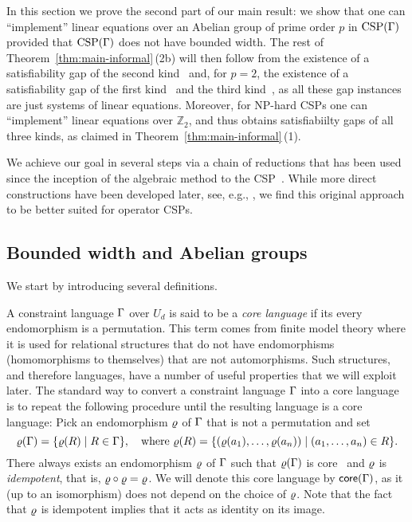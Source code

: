 In this section we prove the second part of our main result: we show that one
can ``implement'' linear equations over an Abelian group of prime order $p$
in ${\rm CSP}(\Gamma)$ provided that ${\rm CSP}(\Gamma)$ does not have bounded width. The rest
of Theorem~\ref{thm:main-informal}\,(2b) will then follow from the existence of a
satisfiability gap of the second kind~\cite{SZ24:personal} and, for $p=2$, the
existence of a satisfiability gap of the first
kind~\cite{Mermin1990simple,Mermin1993hidden,Peres1990incompatible} and the
third kind~\cite{Slofstra20:jams}, as all these gap instances are just systems
of linear equations. Moreover, for NP-hard CSPs one can ``implement'' linear
equations over $\mathbb{Z}_2$, and thus obtains satisfiabiilty gaps of all three
kinds, as claimed in Theorem~\ref{thm:main-informal}\,(1).

We achieve our goal in several steps via a chain of reductions that has been
used since the inception of the algebraic method to the
CSP~\cite{Bulatov05:classifying}. While more direct constructions have been
developed later, see, e.g., \cite{BKW17}, we find this original approach to be
better suited for operator CSPs.


\subsection{Bounded width and Abelian groups}

We start by introducing several definitions. 

A constraint language $\Gamma$ over $U_d$ is said to be a \emph{core language} if
its every endomorphism is a permutation.
This term comes from finite model theory where it is used for relational structures that do not have endomorphisms (homomorphisms to themselves) that are not automorphisms. Such structures, and therefore languages, have a number of useful properties that we will exploit later. The standard way to convert a constraint language $\Gamma$ into a core language is to repeat the following procedure until the resulting language is a core language: Pick an endomorphism $\varrho$ of $\Gamma$ that is not a permutation and set 
\[
\varrho(\Gamma)=\{\varrho(R)\mid R\in\Gamma\}, \quad\text{where } \varrho(R)=\{(\varrho(a_1),\ldots, \varrho(a_n))\mid  (a _1,\ldots, a _{n})\in R\}.
\]
There always exists an endomorphism $\varrho$ of $\Gamma$ such that $\varrho(\Gamma)$ is
core~\cite{Bulatov05:classifying,BKW17} and $\varrho$ is \emph{idempotent}, that is, $\varrho\circ\varrho=\varrho$. We will denote this core language by $\mathsf{core}(\Gamma)$, as it (up to an isomorphism) does not depend on the choice of $\varrho$. Note that the fact that $\varrho$ is idempotent implies that it acts as identity on its image.

